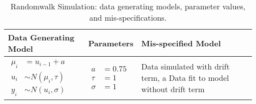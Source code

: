 \begin{table}[h]
    \caption{Randomwalk Simulation: data generating models, parameter values, and mis-specifications.}
    \begin{tabular}{llp{8cm}}
    \toprule
    Data Generating Model & Parameters & Mis-specified Model \\
    \hline
    {$\!\begin{aligned}
     \mu_{i} &= u_{i-1} + a \\
    u_{i} &\sim N(\mu_{i},\tau) \\
    y_{i} &\sim N(u_{i}, \sigma) 
    \end{aligned}$}
    &
    {$\!\begin{aligned}
    a &= 0.75 \\
    \tau &= 1 \\ 
    \sigma &= 1 
    \end{aligned}$}
    &
    Data simulated with drift term, a \newline
    Data fit to model without drift term\\
    \bottomrule
    \end{tabular}
    \end{table}